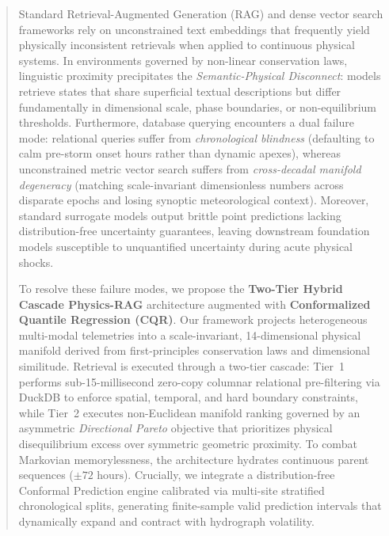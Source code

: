 \documentclass[journal]{IEEEtran}
\begin{document}
\begin{abstract}
Standard Retrieval-Augmented Generation (RAG) and dense vector search frameworks rely on unconstrained text embeddings that frequently yield physically inconsistent retrievals when applied to continuous physical systems. In environments governed by non-linear conservation laws, linguistic proximity precipitates the \textit{Semantic-Physical Disconnect}: models retrieve states that share superficial textual descriptions but differ fundamentally in dimensional scale, phase boundaries, or non-equilibrium thresholds. Furthermore, database querying encounters a dual failure mode: relational queries suffer from \textit{chronological blindness} (defaulting to calm pre-storm onset hours rather than dynamic apexes), whereas unconstrained metric vector search suffers from \textit{cross-decadal manifold degeneracy} (matching scale-invariant dimensionless numbers across disparate epochs and losing synoptic meteorological context). Moreover, standard surrogate models output brittle point predictions lacking distribution-free uncertainty guarantees, leaving downstream foundation models susceptible to unquantified uncertainty during acute physical shocks.

To resolve these failure modes, we propose the \textbf{Two-Tier Hybrid Cascade Physics-RAG} architecture augmented with \textbf{Conformalized Quantile Regression (CQR)}. Our framework projects heterogeneous multi-modal telemetries into a scale-invariant, 14-dimensional physical manifold derived from first-principles conservation laws and dimensional similitude. Retrieval is executed through a two-tier cascade: Tier~1 performs sub-15-millisecond zero-copy columnar relational pre-filtering via DuckDB to enforce spatial, temporal, and hard boundary constraints, while Tier~2 executes non-Euclidean manifold ranking governed by an asymmetric \textit{Directional Pareto} objective that prioritizes physical disequilibrium excess over symmetric geometric proximity. To combat Markovian memorylessness, the architecture hydrates continuous parent sequences ($\pm 72\text{ hours}$). Crucially, we integrate a distribution-free Conformal Prediction engine calibrated via multi-site stratified chronological splits, generating finite-sample valid prediction intervals that dynamically expand and contract with hydrograph volatility.


\end{abstract}
\end{document}
